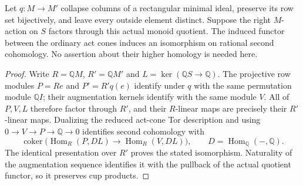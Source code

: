 \begin{lemma}
\label{CP2:A-column-quotient-act-H2}
Let $q:M\to M'$ collapse columns of a rectangular
minimal ideal, preserve its row set bijectively, and
leave every outside element distinct. Suppose the
right $M$-action on $S$ factors through this actual
monoid quotient. The induced functor between the
ordinary act cones induces an isomorphism on rational
second cohomology. No assertion about their higher
homology is needed here.
\end{lemma}
\begin{proof}
Write $R=\mathbb QM$, $R'=\mathbb QM'$ and
$L=\ker(\mathbb QS\to\mathbb Q)$. The projective
row modules $P=Re$ and $P'=R'q(e)$ identify under
$q$ with the same permutation module $\mathbb QI$;
their augmentation kernels identify with the same
module $V$. All of $P,V,L$ therefore factor through
$R'$, and their $R$-linear maps are precisely their
$R'$-linear maps. Dualizing the reduced act-cone
Tor description and using $0\to V\to P\to\mathbb Q\to0$
identifies second cohomology with
\[
 \operatorname{coker}\bigl(
 \operatorname{Hom}_R(P,DL)\longrightarrow
 \operatorname{Hom}_R(V,DL)\bigr),
 \qquad D=\operatorname{Hom}_{\mathbb Q}(-,\mathbb Q).
\]
The identical presentation over $R'$ proves the stated
isomorphism. Naturality of the augmentation sequence
identifies it with the pullback of the actual quotient
functor, so it preserves cup products.
\end{proof}

